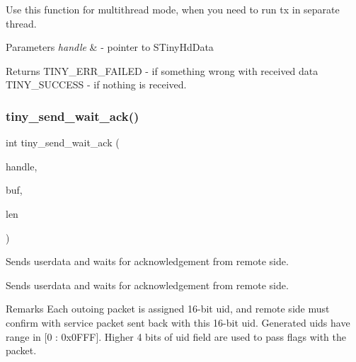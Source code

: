 Use this function for multithread mode, when you need to run tx in separate thread.


\begin{DoxyParams}{Parameters}
{\em handle} & -\/ pointer to S\+Tiny\+Hd\+Data \\
\hline
\end{DoxyParams}
\begin{DoxyReturn}{Returns}
T\+I\+N\+Y\+\_\+\+E\+R\+R\+\_\+\+F\+A\+I\+L\+ED -\/ if something wrong with received data T\+I\+N\+Y\+\_\+\+S\+U\+C\+C\+E\+SS -\/ if nothing is received. 
\end{DoxyReturn}
\mbox{\label{group__HALF__DUPLEX__API_ga5aad8dcb504b80bac923496f2686a6d6}} 
\subsubsection{\texorpdfstring{tiny\+\_\+send\+\_\+wait\+\_\+ack()}{tiny\_send\_wait\_ack()}}
{\footnotesize\ttfamily int tiny\+\_\+send\+\_\+wait\+\_\+ack (\begin{DoxyParamCaption}\item[{\hyperlink{group__HALF__DUPLEX__API_gaf9f81ad129b754a780dfca5dcd7f7cf9}{S\+Tiny\+Hd\+Data} $\ast$}]{handle,  }\item[{void $\ast$}]{buf,  }\item[{uint16\+\_\+t}]{len }\end{DoxyParamCaption})}



Sends userdata and waits for acknowledgement from remote side. 

Sends userdata and waits for acknowledgement from remote side.

\begin{DoxyRemark}{Remarks}
Each outoing packet is assigned 16-\/bit uid, and remote side must confirm with service packet sent back with this 16-\/bit uid. Generated uids have range in \mbox{[}0 \+: 0x0\+F\+FF\mbox{]}. Higher 4 bits of uid field are used to pass flags with the packet.
\end{DoxyRemark}

